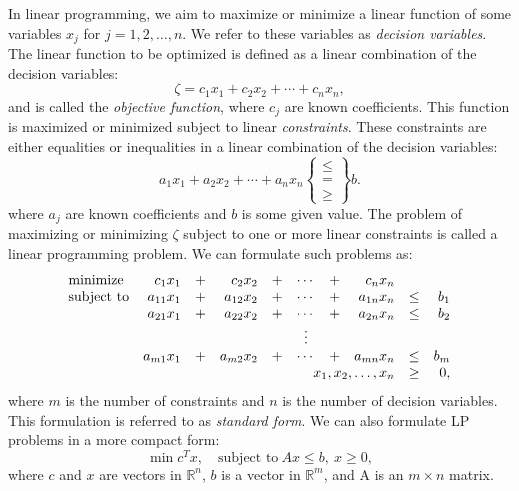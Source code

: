 
In linear programming, we aim to maximize or minimize a linear function of
some variables $x_j$ for $j=1,2,\ldots,n$. We refer to these variables as
\textit{decision variables}. The linear function to be optimized is defined as
a linear combination of the decision variables:
\[
\zeta = c_1 x_1 + c_2 x_2 + \cdots + c_n x_n,
\]
and is called the \textit{objective function}, where $c_j$
are known coefficients.
This function is maximized
or minimized subject to linear \textit{constraints}. These constraints are
either equalities or inequalities in a linear combination
of the decision variables:
\[
a_1x_1 + a_2 x_2 + \cdots + a_n x_n \left\{\begin{array}{c} \leq \\ = \\ \geq \end{array}\right\} b.
\]
where $a_j$ are known coefficients and $b$ is some given value.
The problem of maximizing or minimizing $\zeta$ subject to one or more
linear constraints is called a linear programming problem.
We can formulate such problems as:
\[
\begin{array}{lrcrcccrcr}
\textrm{minimize}   & c_1 x_1    &+& c_2 x_2    &+& \cdots &+& c_n x_n               \\
\textrm{subject to} & a_{11} x_1 &+& a_{12} x_2 &+& \cdots &+& a_{1n} x_n &\leq& b_1 \\
                    & a_{21} x_1 &+& a_{22} x_2 &+& \cdots &+& a_{2n} x_n &\leq& b_2 \\
                    &            & &            & & \vdots & &            &    &     \\
                    & a_{m1} x_1 &+& a_{m2} x_2 &+& \cdots &+& a_{mn} x_n &\leq& b_m \\
                    \multicolumn{8}{r}{x_1,x_2,\ldots,x_n} &\geq& 0,
\end{array}
\]
where $m$ is the number of constraints and $n$ is the number of decision
variables.
This formulation is referred to as \textit{standard form}\cite{vanderbei}.
We can also formulate LP problems in a more compact form:
\begin{equation}
\min{c^T x},\quad \textrm{subject to}~Ax \leq b, ~ x \geq 0, \label{eq:primal}
\end{equation}
where $c$ and $x$ are vectors in $\mathbb{R}^n$, $b$ is a vector in
$\mathbb{R}^m$, and A is an $m \times n$ matrix.

